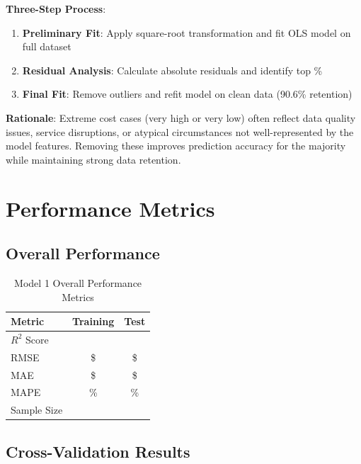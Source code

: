 \textbf{Three-Step Process}:
\begin{enumerate}
    \item \textbf{Preliminary Fit}: Apply square-root transformation and fit OLS model on full dataset
    \item \textbf{Residual Analysis}: Calculate absolute residuals and identify top \ModelOneOutlierPercentage{}\% 
    \item \textbf{Final Fit}: Remove outliers and refit model on clean data (90.6\% retention)
\end{enumerate}

\textbf{Rationale}: Extreme cost cases (very high or very low) often reflect data quality issues, service disruptions, or atypical circumstances not well-represented by the model features. Removing these improves prediction accuracy for the majority while maintaining strong data retention.

\section{Performance Metrics}

\subsection{Overall Performance}

\begin{table}[h]
\centering
\caption{Model 1 Overall Performance Metrics}
\begin{tabular}{lcc}
\toprule
\textbf{Metric} & \textbf{Training} & \textbf{Test} \\
\midrule
$R^2$ Score & \ModelOneRSquaredTrain{} & \ModelOneRSquaredTest{} \\
RMSE & \$\ModelOneRMSETrain{} & \$\ModelOneRMSETest{} \\
MAE & \$\ModelOneMAETrain{} & \$\ModelOneMAETest{} \\
MAPE & \ModelOneMAPETrain{}\% & \ModelOneMAPETest{}\% \\
Sample Size & \ModelOneTrainingSamples{} & \ModelOneTestSamples{} \\
\bottomrule
\end{tabular}
\end{table}

\subsection{Cross-Validation Results}

